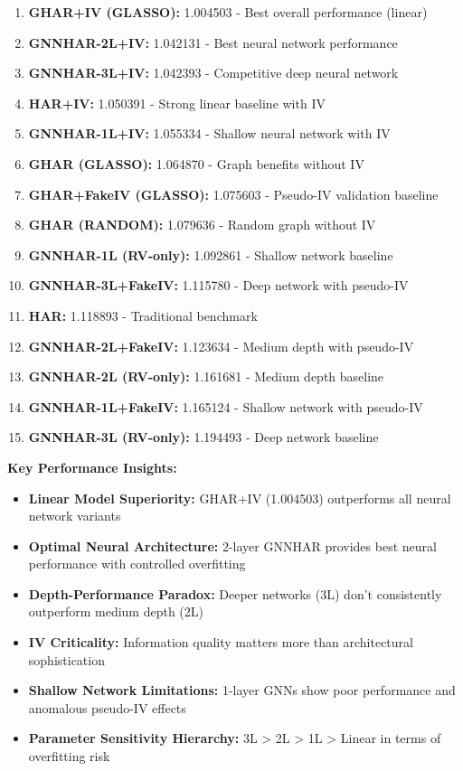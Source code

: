 \documentclass[12pt,a4paper]{article}
\begin{document}
\begin{enumerate}
\item \textbf{GHAR+IV (GLASSO):} 1.004503 - Best overall performance (linear)
\item \textbf{GNNHAR-2L+IV:} 1.042131 - Best neural network performance
\item \textbf{GNNHAR-3L+IV:} 1.042393 - Competitive deep neural network
\item \textbf{HAR+IV:} 1.050391 - Strong linear baseline with IV
\item \textbf{GNNHAR-1L+IV:} 1.055334 - Shallow neural network with IV
\item \textbf{GHAR (GLASSO):} 1.064870 - Graph benefits without IV
\item \textbf{GHAR+FakeIV (GLASSO):} 1.075603 - Pseudo-IV validation baseline
\item \textbf{GHAR (RANDOM):} 1.079636 - Random graph without IV
\item \textbf{GNNHAR-1L (RV-only):} 1.092861 - Shallow network baseline
\item \textbf{GNNHAR-3L+FakeIV:} 1.115780 - Deep network with pseudo-IV
\item \textbf{HAR:} 1.118893 - Traditional benchmark
\item \textbf{GNNHAR-2L+FakeIV:} 1.123634 - Medium depth with pseudo-IV
\item \textbf{GNNHAR-2L (RV-only):} 1.161681 - Medium depth baseline
\item \textbf{GNNHAR-1L+FakeIV:} 1.165124 - Shallow network with pseudo-IV
\item \textbf{GNNHAR-3L (RV-only):} 1.194493 - Deep network baseline
\end{enumerate}

\textbf{Key Performance Insights:}
\begin{itemize}
\item \textbf{Linear Model Superiority:} GHAR+IV (1.004503) outperforms all neural network variants
\item \textbf{Optimal Neural Architecture:} 2-layer GNNHAR provides best neural performance with controlled overfitting
\item \textbf{Depth-Performance Paradox:} Deeper networks (3L) don't consistently outperform medium depth (2L)
\item \textbf{IV Criticality:} Information quality matters more than architectural sophistication
\item \textbf{Shallow Network Limitations:} 1-layer GNNs show poor performance and anomalous pseudo-IV effects
\item \textbf{Parameter Sensitivity Hierarchy:} 3L > 2L > 1L > Linear in terms of overfitting risk
\end{itemize}
\end{document}
